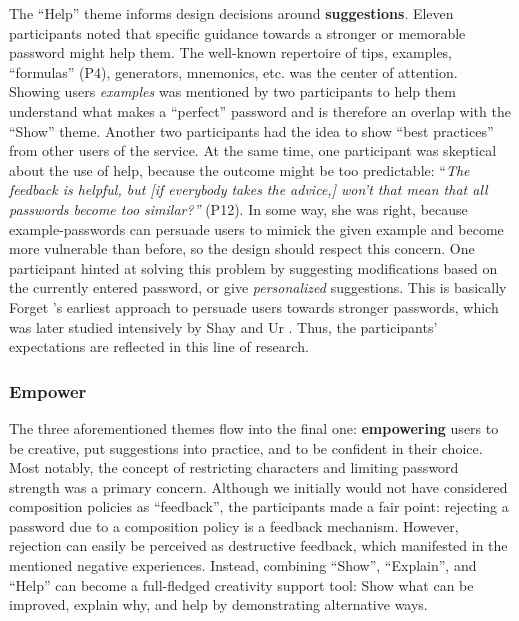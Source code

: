 The ``Help'' theme informs design decisions around \textbf{suggestions}. Eleven participants noted that specific guidance towards a stronger or memorable password might help them. The well-known repertoire of tips, examples, ``formulas'' (P4), generators, mnemonics, etc. was the center of attention. Showing users \textit{examples} was mentioned by two participants to help them understand what makes a ``perfect'' password and is therefore an overlap with the ``Show'' theme. Another two participants had the idea to show ``best practices'' from other users of the service. At the same time, one participant was skeptical about the use of help, because the outcome might be too predictable: ``\textit{The feedback is helpful, but [if everybody takes the advice,] won't that mean that all passwords become too similar?''} (P12). In some way, she was right, because example-passwords can persuade users to mimick the given example and become more vulnerable than before, so the design should respect this concern. One participant hinted at solving this problem by suggesting modifications based on the currently entered password, or give \textit{personalized} suggestions. This is basically Forget \etal's earliest approach to persuade users towards stronger passwords, which was later studied intensively by Shay \etal \cite{Shay2015SpoonfulOfSugar} and Ur \etal \cite{Ur2017DataDrivenPWMeter}. Thus, the participants' expectations are reflected in this line of research.




\subsubsection{Empower}
The three aforementioned themes flow into the final one: \textbf{empowering} users to be creative, put suggestions into practice, and to be confident in their choice. Most notably, the concept of restricting characters and limiting password strength was a primary concern. Although we initially would not have considered composition policies as ``feedback'', the participants made a fair point: rejecting a password due to a composition policy is a feedback mechanism. However, rejection can easily be perceived as destructive feedback, which manifested in the mentioned negative experiences. Instead, combining ``Show'', ``Explain'', and ``Help'' can become a full-fledged creativity support tool: Show what can be improved, explain why, and help by demonstrating alternative ways.

